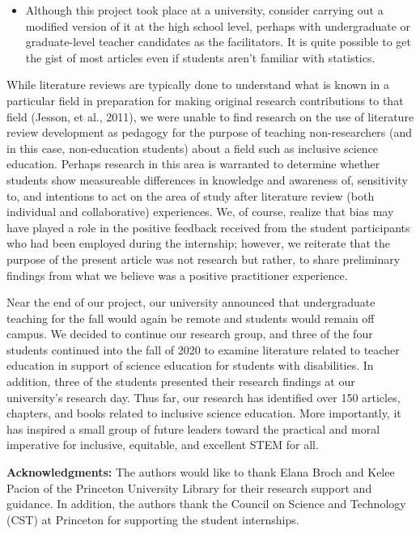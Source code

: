 \documentclass[11.5pt]{sig-alternate}
\begin{document}
\begin{large}
\begin{itemize}
     \item Although this project took place at a university, consider carrying out a modified version of it at the high school level, perhaps with undergraduate or graduate-level teacher candidates as the facilitators.  It is quite possible to get the gist of most articles even if students aren’t familiar with statistics.
 \end{itemize}
 
While literature reviews are typically done to understand what is known in a particular field in preparation for making original research contributions to that field (Jesson, et al., 2011), we were unable to find research on the use of literature review development as pedagogy for the purpose of teaching non-researchers (and in this case, non-education students) about a field such as inclusive science education. Perhaps research in this area is warranted to determine whether students show measureable differences in knowledge and awareness of, sensitivity to, and intentions to act on the area of study after literature review (both individual and collaborative) experiences.  We, of course, realize that bias may have played a role in the positive feedback received from the student participants who had been employed during the internship; however, we reiterate that the purpose of the present article was not research but rather, to share preliminary findings from what we believe was a positive practitioner experience.

Near the end of our project, our university announced that undergraduate teaching for the fall would again be remote and students would remain off campus.  We decided to continue our research group, and three of the four students continued into the fall of 2020 to examine literature related to teacher education in support of science education for students with disabilities.  In addition, three of the students presented their research findings at our university’s research day. Thus far, our research has identified over 150 articles, chapters, and books related to inclusive science education.  More importantly, it has inspired a small group of future leaders toward the practical and moral imperative for inclusive, equitable, and excellent STEM for all.  

\textbf{Acknowledgments:} The authors would like to thank Elana Broch and Kelee Pacion of the Princeton University Library for their research support and guidance.  In addition, the authors thank the Council on Science and Technology (CST) at Princeton for supporting the student internships.  

\end{large}
\clearpage
\end{document}
